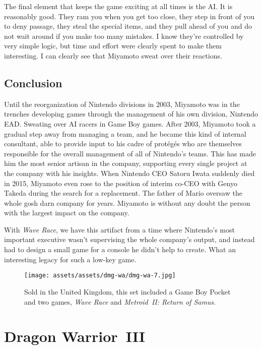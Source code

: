 \documentclass{book}
\begin{document}
The final element that keeps the game exciting at all times is the AI. It is reasonably good. They ram you when you get too close, they step in front of you to deny passage, they steal the special items, and they pull ahead of you and do not wait around if you make too many mistakes. I know they’re controlled by very simple logic, but time and effort were clearly spent to make them interesting. I can clearly see that Miyamoto sweat over their reactions.

\FloatBarrier\needspace{5pt}\section*{Conclusion}\nopagebreak[4]

Until the reorganization of Nintendo divisions in 2003, Miyamoto was in the trenches developing games through the management of his own division, Nintendo EAD. Sweating over AI racers in Game Boy games. After 2003, Miyamoto took a gradual step away from managing a team, and he became this kind of internal consultant, able to provide input to his cadre of protégés who are themselves responsible for the overall management of all of Nintendo’s teams. This has made him the most senior artisan in the company, supporting every single project at the company with his insights. When Nintendo CEO Satoru Iwata suddenly died in 2015, Miyamoto even rose to the position of interim co-CEO with Genyo Takeda during the search for a replacement. The father of Mario oversaw the whole gosh darn company for years. Miyamoto is without any doubt the person with the largest impact on the company.

With \emph{Wave Race}, we have this artifact from a time where Nintendo’s most important executive wasn’t supervising the whole company’s output, and instead had to design a small game for a console he didn’t help to create. What an interesting legacy for such a low-key game.

\begin{figure}[hbt]
\vskip 10pt
\centering \texttt{[image: assets/assets/dmg-wa/dmg-wa-7.jpg]}\par\pagetwodescription Sold in the United Kingdom, this set included a Game Boy Pocket and two games, \emph{Wave Race} and \emph{Metroid II: Return of Samus}.
\vskip 6pt
\end{figure}


\begingroup \chapter*{Dragon Warrior III} \endgroup
\end{document}
